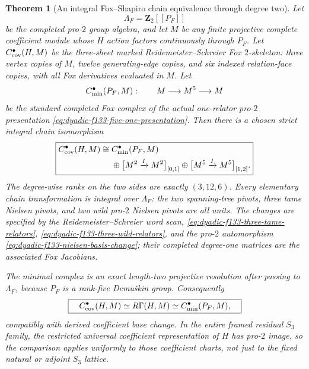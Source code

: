 \documentclass[11pt]{article}
\newtheorem{theorem}{Theorem}[section]
\theoremstyle{definition}
\begin{document}
\begin{theorem}[An integral Fox--Shapiro chain equivalence through degree two]
\label{thm:dyadic-f133-integral-schreier-fox-chain}
Let
\[
\Lambda_F=\mathbf Z_2[[P_F]]
\]
be the completed
pro-$2$ group algebra,
and let $M$ be
\emph{any} finite
projective complete
coefficient module
whose $H$ action
factors continuously
through $P_F$.
Let
$C_{\rm cov}^\bullet(H,M)$
be the three-sheet
marked
Reidemeister--Schreier
Fox $2$-skeleton:
three vertex copies
of $M$,
twelve generating-edge
copies, and six
indexed relation-face
copies, with
\emph{all} Fox
derivatives evaluated
in $M$.
Let
\[
C_{\rm min}^\bullet(P_F,M):
\qquad
M\longrightarrow M^5\longrightarrow M
\]
be the standard
completed Fox
complex of
the \emph{actual}
one-relator
pro-$2$
presentation
\eqref{eq:dyadic-f133-five-one-presentation}.
Then there is a
\emph{chosen strict
integral chain
isomorphism}
\begin{equation}\label{eq:dyadic-f133-integral-chain-split}
\boxed{
\begin{aligned}
C_{\rm cov}^\bullet(H,M)
\cong {}&
C_{\rm min}^\bullet(P_F,M)\\
&\oplus
\bigl[M^2\xrightarrow{I}M^2\bigr]_{[0,1]}
\oplus
\bigl[M^5\xrightarrow{I}M^5\bigr]_{[1,2]}.
\end{aligned}}
\end{equation}
The degree-wise
ranks on the
two sides are
exactly $(3,12,6)$.
Every elementary
chain transformation
is integral over
$\Lambda_F$:
the two spanning-tree
pivots, three
tame Nielsen
pivots, and
two wild pro-$2$
Nielsen pivots
are all units.
The changes are
specified by the
Reidemeister--Schreier
word scan,
\eqref{eq:dyadic-f133-three-tame-relators},
\eqref{eq:dyadic-f133-three-wild-relators},
and the pro-$2$
automorphism
\eqref{eq:dyadic-f133-nielsen-basis-change};
their completed
degree-one matrices
are the associated
Fox Jacobians.

The minimal complex
is an \emph{exact}
length-two
projective
resolution after
passing to
$\Lambda_F$,
because $P_F$ is
a rank-five
Demu\v{s}kin group.
Consequently
\begin{equation}\label{eq:dyadic-f133-complete-derived-fact}
\boxed{\quad
C_{\rm cov}^\bullet(H,M)
\simeq R\Gamma(H,M)
\simeq C_{\rm min}^\bullet(P_F,M),
\quad}
\end{equation}
compatibly with
derived coefficient
base change.
In the entire
framed residual
$S_3$ family,
the restricted
universal
coefficient
representation of
$H$ has pro-$2$
image, so the
comparison applies
\emph{uniformly}
to those
coefficient charts,
not just to
the fixed natural
or adjoint
$S_3$ lattice.


\end{theorem}
\end{document}
